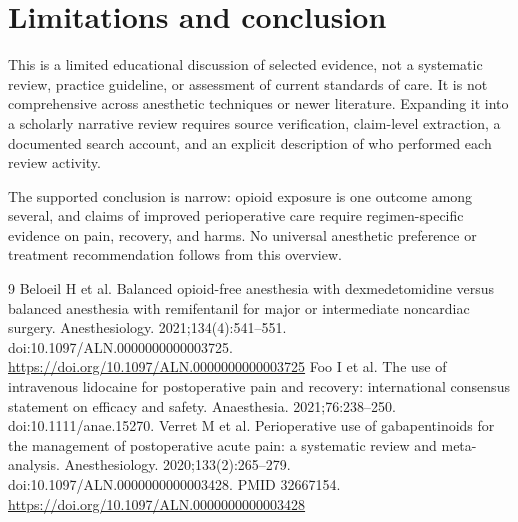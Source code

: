 \documentclass[11pt]{article}
\begin{document}
\section{Limitations and conclusion}
This is a limited educational discussion of selected evidence, not a systematic review, practice guideline, or assessment of current standards of care. It is not comprehensive across anesthetic techniques or newer literature. Expanding it into a scholarly narrative review requires source verification, claim-level extraction, a documented search account, and an explicit description of who performed each review activity.

The supported conclusion is narrow: opioid exposure is one outcome among several, and claims of improved perioperative care require regimen-specific evidence on pain, recovery, and harms. No universal anesthetic preference or treatment recommendation follows from this overview.
\begin{thebibliography}{9}
 Beloeil H et al. Balanced opioid-free anesthesia with dexmedetomidine versus balanced anesthesia with remifentanil for major or intermediate noncardiac surgery. Anesthesiology. 2021;134(4):541--551. doi:10.1097/ALN.0000000000003725. \url{https://doi.org/10.1097/ALN.0000000000003725}
 Foo I et al. The use of intravenous lidocaine for postoperative pain and recovery: international consensus statement on efficacy and safety. Anaesthesia. 2021;76:238--250. doi:10.1111/anae.15270.
 Verret M et al. Perioperative use of gabapentinoids for the management of postoperative acute pain: a systematic review and meta-analysis. Anesthesiology. 2020;133(2):265--279. doi:10.1097/ALN.0000000000003428. PMID 32667154. \url{https://doi.org/10.1097/ALN.0000000000003428}
\end{thebibliography}
\end{document}
